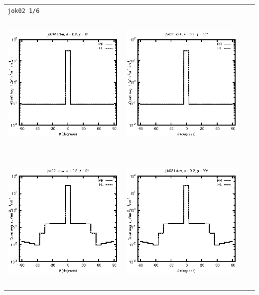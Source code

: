 \begin{tabular}{c c c c}
\multicolumn{4}{l}{\texttt{jok02 1/6}} \\
\includegraphics[height=7cm]{../eps/jok02_Ld_a_fwd.eps} &
\includegraphics[height=7cm]{../eps/jok02_Ld_a_cross.eps}\\
\includegraphics[height=7cm]{../eps/jok02_Ld_w_fwd.eps} &
\includegraphics[height=7cm]{../eps/jok02_Ld_w_cross.eps} \\

\end{tabular}
